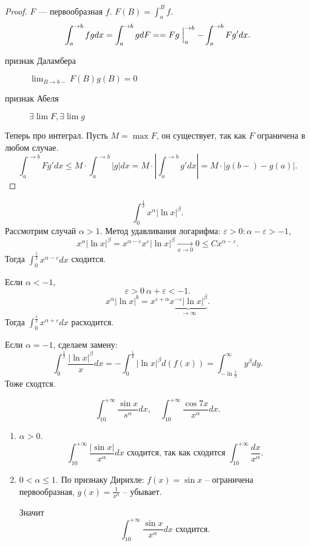     \begin{proof}
	$ F$ --- первообразная $ f$.  $ F(B) = \int_{a}^{B} f $.
	\[
	    \int_{a}^{\to b} f g dx = \int_{a}^{ \to b} g dF == F g \Bigm|_{a}^{\to b} - \int_{a}^{ \to b} F g' dx
	.\]
	\begin{description}
	    \item[признак Даламбера] $ \lim_{B \to b-} F(B) g(B) = 0 $
	    \item[признак Абеля] $ \exists \lim F, \exists  \lim g $
	\end{description}
	Теперь про интеграл.
	Пусть $ M = \max{F}$, он существует, так как  $ F$ ограничена в любом случае.
	\[
	    \int_{a}^{ \to b} F g' dx \le  M \cdot  \int_{ a}^{  \to  b}  |g| dx   = M \cdot \left| \int_{a}^{ \to b} g' dx  \right|  = M \cdot  \left| g(b-) - g(a) \right|
	.\]
    \end{proof}
    \begin{ex}
	\[
	    \int_{0}^{ \frac{1}{2}} x^{\alpha} | \ln x|^{ \beta }
	.\]
	Рассмотрим случай $ \alpha  > 1$.
	Метод удавливания логарифма:
	$ \varepsilon >0 : \alpha - \varepsilon  > -1$,
	\[
	    x^{ \alpha } | \ln x| ^{\beta} = x ^{ \alpha  - \varepsilon } x ^{ \varepsilon } | \ln x|^{ \beta }{ \underset{x \to 0}{\longrightarrow} 0} \le  C x ^{ \alpha - \varepsilon }
	.\]
	Тогда $ \int_{0}^{ \frac{1}{2}} x^{ \alpha - \varepsilon } dx $ сходится.

	Если $ \alpha  < -1$,
	\[
	    \varepsilon  >0 ~ \alpha + \varepsilon  < -1
	.\]
	\[
	    x^{ \alpha } |\ln x| ^{b} = x^{ \varepsilon  + \alpha } \underbrace{x^{ - \varepsilon } |\ln x|^{ \beta }}_{\to \infty}
	.\]
	Тогда $ \int_{0}^{ \frac{1}{2}} x^{ \alpha + \varepsilon } dx $ расходится.

	Если $ \alpha = -1$, сделаем замену:
	\[
	    \int_{0}^{ \frac{1}{2}} \frac{|\ln x|^{\beta} }{x} dx = - \int_{0}^{\frac{1}{2}}  |\ln x| ^{ \beta } d(f(x) ) = \int_{- \ln \frac{1}{2}}^{\infty}  y ^{  \beta } dy
	.\]
	Тоже сходтся.
    \end{ex}
    \begin{ex}
	\[
	    \int_{10}^{ +\infty}  \frac{\sin x}{s^{ \alpha }}	dx , \quad \int_{10}^{+\infty} \frac{\cos 7x}{x^{ \alpha }}  dx
	.\]
	\begin{enumerate}
	    \item  $\alpha  > 0$.
		\[
		    \int_{10}^{+ \infty}  \frac{| \sin x|}{x ^{ \alpha }} dx \text{ сходится, так как сходится }
		    \int_{10}^{+\infty} \frac{dx}{x^{ \alpha }}
		.\]
	    \item $ 0 < \alpha  \le  1$. По признаку Дирихле: $ f(x) = \sin x $ -- ограничена первообразная, $ g(x) = \frac{1}{x^{ \alpha }}$ -- убывает.

		Значит
		\[
		    \int_{10}^{+\infty}  \frac{\sin x}{x^{ \alpha }} dx \text{ сходится}
		.\]
	\end{enumerate}
    \end{ex}
